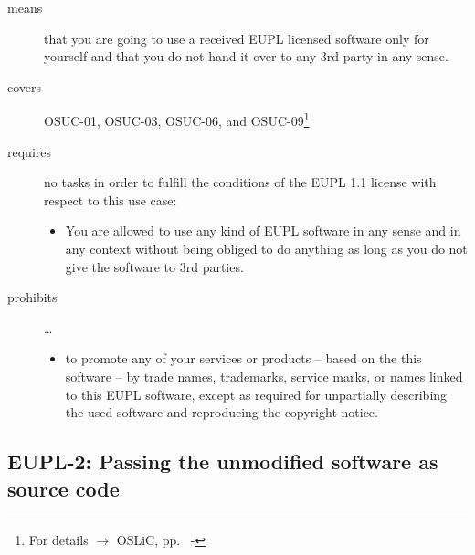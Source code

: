 \begin{description}

\item[means] that you are going to use a received EUPL licensed software only
for yourself and that you do not hand it over to any 3rd party in any sense.

\item[covers] OSUC-01, OSUC-03, OSUC-06, and OSUC-09\footnote{For details 
$\rightarrow$ OSLiC, pp.\ \pageref{OSUC-01-DEF} - \pageref{OSUC-09-DEF}}

\item[requires] no tasks in order to fulfill the conditions of the EUPL 1.1
license with respect to this use case:
  \begin{itemize}
    \item You are allowed to use any kind of EUPL software in any sense and in
    any context without being obliged to do anything as long as you do not
    give the software to 3rd parties.
  \end{itemize}
  
\item[prohibits] \ldots
\begin{itemize}
  \item to promote any of your services or products -- based on the this software
  -- by trade names, trademarks, service marks, or names linked to this EUPL
  software, except as required for unpartially describing the used software and
  reproducing the copyright notice.
\end{itemize}

\end{description}

\subsection{EUPL-2: Passing the unmodified software as source code}
\label{OSUC-02-EUPL} \label{OSUC-05-EUPL} \label{OSUC-07-EUPL} 

